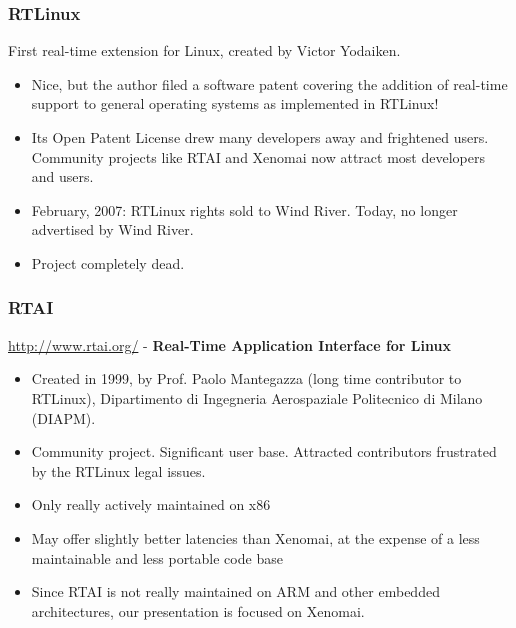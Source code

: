 \begin{frame}
  \frametitle{RTLinux}
  First real-time extension for Linux, created by Victor Yodaiken.
  \begin{itemize}
  \item Nice, but the author filed a software patent covering the
    addition of real-time support to general operating systems as
    implemented in RTLinux!
  \item Its Open Patent License drew many developers away and
    frightened users.  Community projects like RTAI and Xenomai now
    attract most developers and users.
  \item February, 2007: RTLinux rights sold to Wind River. Today,
    no longer advertised by Wind River.
  \item Project completely dead.
  \end{itemize}
\end{frame}

\begin{frame}
  \frametitle{RTAI}
  \url{http://www.rtai.org/} - {\bf Real-Time Application Interface for Linux}
  \begin{itemize}
  \item Created in 1999, by Prof. Paolo Mantegazza (long time
    contributor to RTLinux), Dipartimento di Ingegneria Aerospaziale
    Politecnico di Milano (DIAPM).
  \item Community project. Significant user base. Attracted
    contributors frustrated by the RTLinux legal issues.
  \item Only really actively maintained on x86
  \item May offer slightly better latencies than Xenomai, at the
    expense of a less maintainable and less portable code base
  \item Since RTAI is not really maintained on ARM and other embedded
    architectures, our presentation is focused on Xenomai.
  \end{itemize}
\end{frame}

